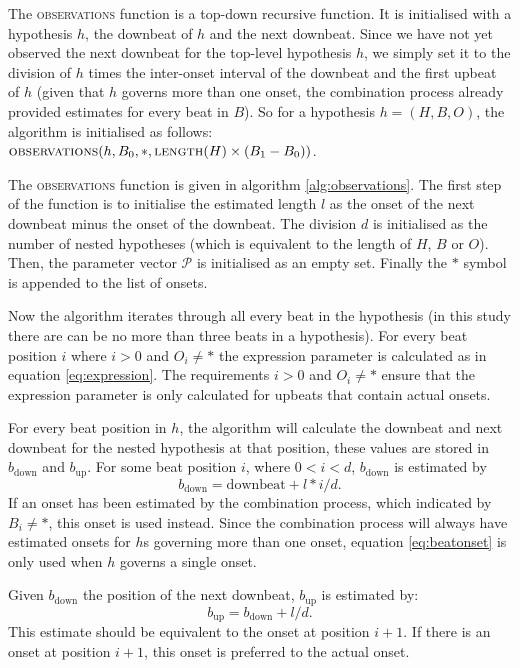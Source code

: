 The \textsc{observations} function is a top-down recursive function. It is initialised with a hypothesis $h$, the downbeat of $h$ and the next downbeat. Since we have not yet observed the next downbeat for the top-level hypothesis $h$, we simply set it to the division of $h$ times the inter-onset interval of the downbeat and the first upbeat of $h$ (given that $h$ governs more than one onset, the combination process already provided estimates for every beat in $B$). So for a hypothesis $h = (H, B, O)$, the algorithm is initialised as follows: $\textsc{observations}(h, B_0, *, \textsc{length}(H) \times (B_1 - B_0))$.

The \textsc{observations} function is given in algorithm \ref{alg:observations}. The first step of the function is to initialise the estimated length $l$ as the onset of the next downbeat minus the onset of the downbeat. The division $d$ is initialised as the number of nested hypotheses (which is equivalent to the length of $H$, $B$ or $O$). Then, the parameter vector $\mathcal{P}$ is initialised as an empty set. Finally the $*$ symbol is appended to the list of onsets.

Now the algorithm iterates through all every beat in the hypothesis (in this study there are can be no more than three beats in a hypothesis). For every beat position $i$ where $i > 0$ and $O_i \neq *$ the expression parameter is calculated as in equation \ref{eq:expression}. The requirements $i > 0$ and $O_i \neq *$ ensure that the expression parameter is only calculated for upbeats that contain actual onsets. 

For every beat position in $h$, the algorithm will calculate the downbeat and next downbeat for the nested hypothesis at that position, these values are stored in $b_{\mathrm{down}}$ and $b_{\mathrm{up}}$. 
For some beat position $i$, where $0 < i < d$, $b_{\mathrm{down}}$ is estimated by
\begin{equation}
\label{eq:beatonset}
b_{\mathrm{down}} = \mathrm{downbeat} + l * i/d.
\end{equation}
If an onset has been estimated by the combination process, which indicated by $B_i \neq *$, this onset is used instead. Since the combination process will always have estimated onsets for $h$s governing more than one onset, equation \ref{eq:beatonset} is only used when $h$ governs a single onset.

Given $b_{\mathrm{down}}$ the position of the next downbeat, $b_{\mathrm{up}}$ is estimated by:
\begin{equation}
b_{\mathrm{up}} = b_{\mathrm{down}} + l/d.
\end{equation}
This estimate should be equivalent to the onset at position $i+1$. If there is an onset at position $i+1$, this onset is preferred to the actual onset.

